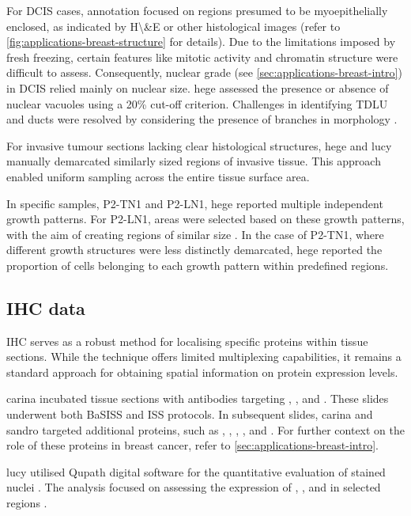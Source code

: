 For \acf{DCIS} cases, annotation focused on regions presumed to be myoepithelially enclosed, as indicated by \ac{H\&E} or other histological images (refer to \cref{fig:applications-breast-structure} for details). Due to the limitations imposed by fresh freezing, certain features like mitotic activity and chromatin structure were difficult to assess. Consequently, nuclear grade (see \cref{sec:applications-breast-intro}) in \ac{DCIS} relied mainly on nuclear size. \acs{hege} assessed the presence or absence of nuclear vacuoles using a 20\% cut-off criterion. Challenges in identifying \ac{TDLU} and ducts were resolved by considering the presence of branches in morphology .

For invasive tumour sections lacking clear histological structures, \acs{hege} and \acs{lucy} manually demarcated similarly sized regions of invasive tissue. This approach enabled uniform sampling across the entire tissue surface area.

In specific samples, P2-TN1 and P2-LN1, \acs{hege} reported multiple independent growth patterns. For P2-LN1, areas were selected based on these growth patterns, with the aim of creating regions of similar size . In the case of P2-TN1, where different growth structures were less distinctly demarcated, \acs{hege} reported the proportion of cells belonging to each growth pattern within predefined regions.

\subsection{\acl{IHC} data}
\label{sec:modalities-ihc}

\acl{IHC} serves as a robust method for localising specific proteins within tissue sections. While the technique offers limited multiplexing capabilities, it remains a standard approach for obtaining spatial information on protein expression levels.

\acf{carina} incubated tissue sections with antibodies targeting , , and . These slides underwent both \ac{BaSISS} and \ac{ISS} protocols. In subsequent slides, \acs{carina} and \acs{sandro} targeted additional proteins, such as , , , , and . For further context on the role of these proteins in breast cancer, refer to \cref{sec:applications-breast-intro}.

\ac{lucy} utilised Qupath digital software for the quantitative evaluation of stained nuclei \parencite{Bankhead2017-px}. The analysis focused on assessing the expression of , , and  in selected regions .

